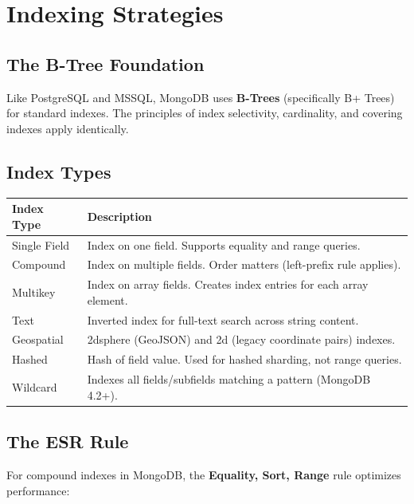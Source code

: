 \documentclass[12pt,a4paper]{article}
\begin{document}
\section{Indexing Strategies}

\subsection{The B-Tree Foundation}

Like PostgreSQL and MSSQL, MongoDB uses \textbf{B-Trees} (specifically B+ Trees) for standard indexes. The principles of index selectivity, cardinality, and covering indexes apply identically.

\subsection{Index Types}

\begin{center}
\begin{tabular}{@{}p{3cm}p{9cm}@{}}
\toprule
\textbf{Index Type} & \textbf{Description} \\
\midrule
Single Field & Index on one field. Supports equality and range queries. \\
Compound & Index on multiple fields. Order matters (left-prefix rule applies). \\
Multikey & Index on array fields. Creates index entries for each array element. \\
Text & Inverted index for full-text search across string content. \\
Geospatial & 2dsphere (GeoJSON) and 2d (legacy coordinate pairs) indexes. \\
Hashed & Hash of field value. Used for hashed sharding, not range queries. \\
Wildcard & Indexes all fields/subfields matching a pattern (MongoDB 4.2+). \\
\bottomrule
\end{tabular}
\end{center}

\subsection{The ESR Rule}

For compound indexes in MongoDB, the \textbf{Equality, Sort, Range} rule optimizes performance:
\end{document}
